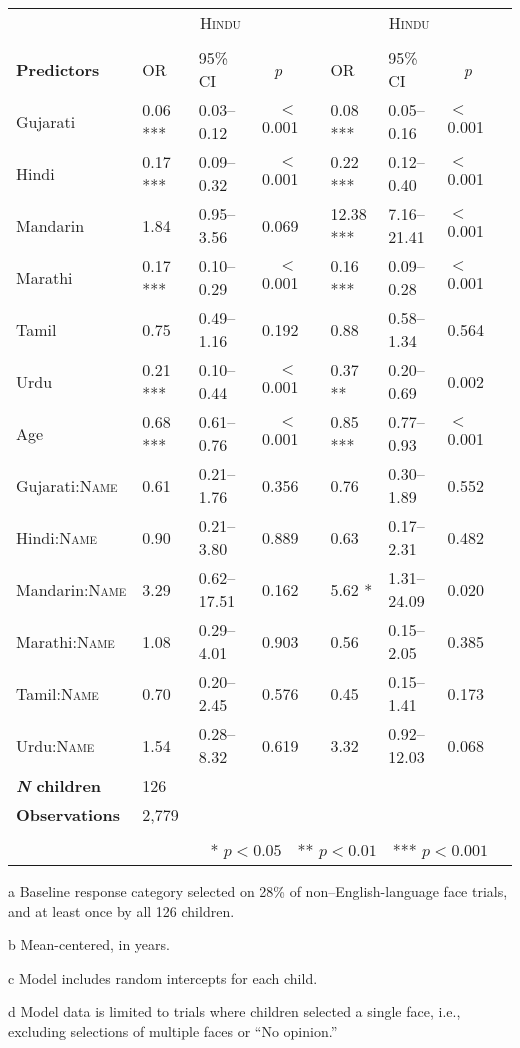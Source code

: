 \begin{table}[ht]
\begin{threeparttable}
\begin{tabular}{lllrllllr}
& \multicolumn{3}{c}{\textsc{Hindu}\tnote{a}} & & \multicolumn{3}{c}{\textsc{Hindu}\tnote{a}} \\
\cline{2-4} \cline{6-8} \\[-.75em]
\textbf{Predictors} & OR & 95\% CI & \multicolumn{1}{c}{\textit{p}} & & OR & 95\% CI & \multicolumn{1}{c}{\textit{p}} \\ 
\midrule
Gujarati & 0.06 *** & 0.03--0.12 & $<$0.001 &  & 0.08 *** & 0.05--0.16 & $<$0.001 \\ 
Hindi & 0.17 *** & 0.09--0.32 & $<$0.001 &  & 0.22 *** & 0.12--0.40 & $<$0.001 \\ 
Mandarin & 1.84 & 0.95--3.56 & 0.069 &  & 12.38 *** & 7.16--21.41 & $<$0.001 \\ 
Marathi & 0.17 *** & 0.10--0.29 & $<$0.001 &  & 0.16 *** & 0.09--0.28 & $<$0.001 \\ 
Tamil & 0.75 & 0.49--1.16 & 0.192 &  & 0.88 & 0.58--1.34 & 0.564 \\ 
Urdu & 0.21 *** & 0.10--0.44 & $<$0.001 &  & 0.37 ** & 0.20--0.69 & 0.002 \\ 
Age\tnote{b} & 0.68 *** & 0.61--0.76 & $<$0.001 &  & 0.85 *** & 0.77--0.93 & $<$0.001 \\ 
Gujarati:\textsc{Name} & 0.61 & 0.21--1.76 & 0.356 &  & 0.76 & 0.30--1.89 & 0.552 \\ 
Hindi:\textsc{Name} & 0.90 & 0.21--3.80 & 0.889 &  & 0.63 & 0.17--2.31 & 0.482 \\ 
Mandarin:\textsc{Name} & 3.29 & 0.62--17.51 & 0.162 &  & 5.62 * & 1.31--24.09 & 0.020 \\ 
Marathi:\textsc{Name} & 1.08 & 0.29--4.01 & 0.903 &  & 0.56 & 0.15--2.05 & 0.385 \\ 
Tamil:\textsc{Name} & 0.70 & 0.20--2.45 & 0.576 &  & 0.45 & 0.15--1.41 & 0.173 \\ 
Urdu:\textsc{Name} & 1.54 & 0.28--8.32 & 0.619 &  & 3.32 & 0.92--12.03 & 0.068 \\ 
\midrule
\bfseries{\textit{N} children}\tnote{c} & 126   &  &  &  &  &  &  \\
\textbf{Observations}\tnote{d} & 2,779  &  &  &  &  &  &  \\
\bottomrule\\[-.75em]
\multicolumn{8}{r}{* $p<0.05$~~** $p<0.01$~~*** $p<0.001$}\\
\end{tabular}
\begin{tablenotes}[flushleft]
    \item[a] Baseline response category selected on 28\% of non--English-language face trials, and at least once by all 126 children. %
    \item[b] Mean-centered, in years.
    \item[c] Model includes random intercepts for each child.
    \item[d] Model data is limited to trials where children selected a single face, i.e., excluding selections of multiple faces or ``No opinion.'' 
\end{tablenotes}
\end{threeparttable}
\end{table}